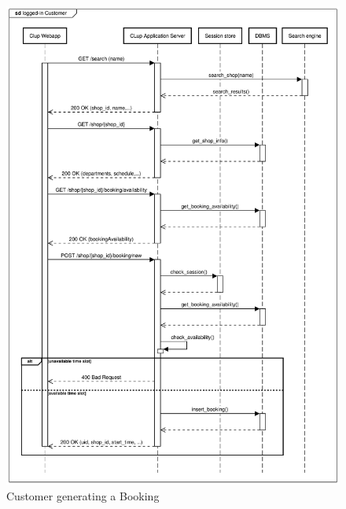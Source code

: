 \begin{figure}[H]
    \centering
    \includegraphics[width=1\textwidth]{Images/runtime_booking.pdf}
    \caption{Customer generating a Booking}
\end{figure}
